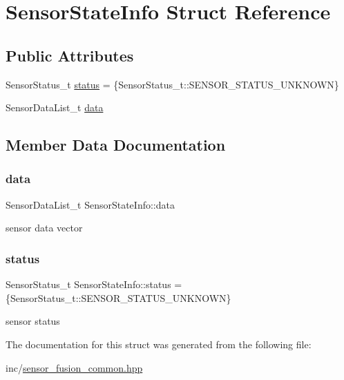 \hypertarget{structSensorStateInfo}{}\section{Sensor\+State\+Info Struct Reference}
\label{structSensorStateInfo}
\subsection*{Public Attributes}
\begin{DoxyCompactItemize}
\item 
Sensor\+Status\+\_\+t \hyperlink{structSensorStateInfo_aa0f0949bb0760ccae3b6516b6bcd9bc1}{status} = \{Sensor\+Status\+\_\+t\+::\+S\+E\+N\+S\+O\+R\+\_\+\+S\+T\+A\+T\+U\+S\+\_\+\+U\+N\+K\+N\+O\+WN\}
\item 
Sensor\+Data\+List\+\_\+t \hyperlink{structSensorStateInfo_a8decf8a5d8652f0902ab55fbb4659c11}{data}
\end{DoxyCompactItemize}


\subsection{Member Data Documentation}
\mbox{\label{structSensorStateInfo_a8decf8a5d8652f0902ab55fbb4659c11}} 
\subsubsection{\texorpdfstring{data}{data}}
{\footnotesize\ttfamily Sensor\+Data\+List\+\_\+t Sensor\+State\+Info\+::data}

sensor data vector \mbox{\label{structSensorStateInfo_aa0f0949bb0760ccae3b6516b6bcd9bc1}} 
\subsubsection{\texorpdfstring{status}{status}}
{\footnotesize\ttfamily Sensor\+Status\+\_\+t Sensor\+State\+Info\+::status = \{Sensor\+Status\+\_\+t\+::\+S\+E\+N\+S\+O\+R\+\_\+\+S\+T\+A\+T\+U\+S\+\_\+\+U\+N\+K\+N\+O\+WN\}}

sensor status 

The documentation for this struct was generated from the following file\+:\begin{DoxyCompactItemize}
\item 
inc/\hyperlink{sensor__fusion__common_8hpp}{sensor\+\_\+fusion\+\_\+common.\+hpp}\end{DoxyCompactItemize}
